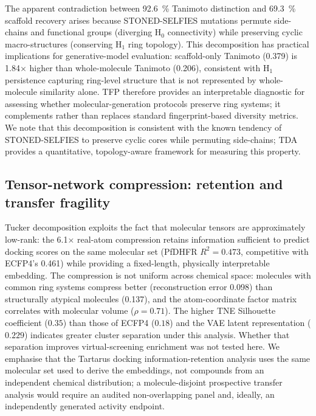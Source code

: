 \documentclass[11pt,a4paper]{article}
\begin{document}
The apparent contradiction between \qty{92.6}{\percent} Tanimoto distinction and \qty{69.3}{\percent} scaffold recovery arises because STONED-SELFIES mutations permute side-chains and functional groups (diverging H$_0$ connectivity) while preserving cyclic macro-structures (conserving H$_1$ ring topology). This decomposition has practical implications for generative-model evaluation: scaffold-only Tanimoto (\num{0.379}) is \num{1.84}$\times$ higher than whole-molecule Tanimoto (\num{0.206}), consistent with H$_1$ persistence capturing ring-level structure that is not represented by whole-molecule similarity alone. TFP therefore provides an interpretable diagnostic for assessing whether molecular-generation protocols preserve ring systems; it complements rather than replaces standard fingerprint-based diversity metrics. We note that this decomposition is consistent with the known tendency of STONED-SELFIES to preserve cyclic cores while permuting side-chains; TDA provides a quantitative, topology-aware framework for measuring this property.

\subsection{Tensor-network compression: retention and transfer fragility}

Tucker decomposition exploits the fact that molecular tensors are approximately low-rank: the \num{6.1}$\times$ real-atom compression retains information sufficient to predict docking scores on the same molecular set (PfDHFR $R^2 = \num{0.473}$, competitive with ECFP4's \num{0.461}) while providing a fixed-length, physically interpretable embedding. The compression is not uniform across chemical space: molecules with common ring systems compress better (reconstruction error \num{0.098}) than structurally atypical molecules (\num{0.137}), and the atom-coordinate factor matrix correlates with molecular volume ($\rho = \num{0.71}$). The higher TNE Silhouette coefficient ($\num{0.35}$) than those of ECFP4 ($\num{0.18}$) and the VAE latent representation ($\num{0.229}$) indicates greater cluster separation under this analysis. Whether that separation improves virtual-screening enrichment was not tested here. We emphasise that the Tartarus docking information-retention analysis uses the same molecular set used to derive the embeddings, not compounds from an independent chemical distribution; a molecule-disjoint prospective transfer analysis would require an audited non-overlapping panel and, ideally, an independently generated activity endpoint.
\end{document}
